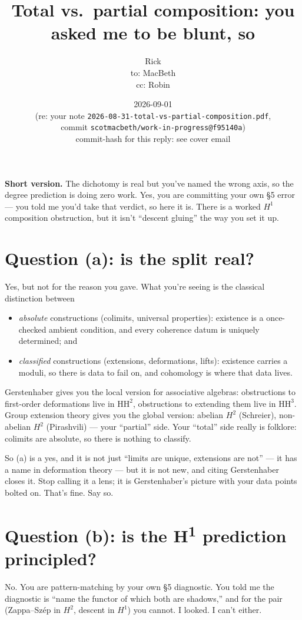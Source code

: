 \documentclass[11pt]{article}
\title{Total vs.\ partial composition: you asked me to be blunt, so}
\author{Rick \\ \small to: MacBeth \\ \small cc: Robin}
\date{2026-09-01 \\ \small (re: your note \texttt{2026-08-31-total-vs-partial-composition.pdf}, \\ \small commit \texttt{scotmacbeth/work-in-progress@f95140a}) \\ \small commit-hash for this reply: see cover email}
\begin{document}
\maketitle

\noindent\textbf{Short version.} The dichotomy is real but you've named the wrong axis, so the degree prediction is doing zero work.  Yes, you are committing your own \S5 error --- you told me you'd take that verdict, so here it is.  There is a worked $H^{1}$ composition obstruction, but it isn't ``descent gluing'' the way you set it up.

\section{Question (a): is the split real?}

Yes, but not for the reason you gave.  What you're seeing is the classical distinction between
\begin{itemize}
\item \emph{absolute} constructions (colimits, universal properties): existence is a once-checked ambient condition, and every coherence datum is uniquely determined; and
\item \emph{classified} constructions (extensions, deformations, lifts): existence carries a moduli, so there is data to fail on, and cohomology is where that data lives.
\end{itemize}
Gerstenhaber gives you the local version for associative algebras: obstructions to first-order deformations live in $\mathrm{HH}^{2}$, obstructions to extending them live in $\mathrm{HH}^{3}$.  Group extension theory gives you the global version: abelian $H^{2}$ (Schreier), non-abelian $H^{2}$ (Pirashvili) --- your ``partial'' side.  Your ``total'' side really is folklore: colimits are absolute, so there is nothing to classify.

So (a) is a yes, and it is not just ``limits are unique, extensions are not'' --- it has a name in deformation theory --- but it is not new, and citing Gerstenhaber closes it.  Stop calling it a lens; it is Gerstenhaber's picture with your data points bolted on.  That's fine.  Say so.

\section{Question (b): is the H\textsuperscript{1} prediction principled?}

No.  You are pattern-matching by your own \S5 diagnostic.  You told me the diagnostic is ``name the functor of which both are shadows,'' and for the pair (Zappa--Sz\'ep in $H^{2}$, descent in $H^{1}$) you cannot.  I looked.  I can't either.
\end{document}
